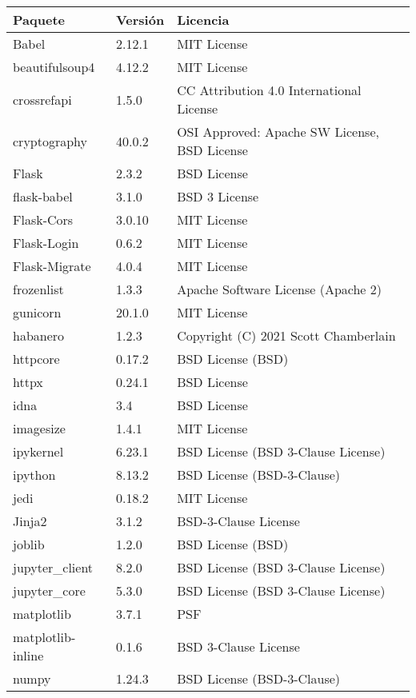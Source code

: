 \begin{table}[h]
\centering
\begin{tabular}{|l|l|l|}
\hline
\textbf{Paquete} & \textbf{Versión}& \textbf{Licencia} \\ \hline
Babel & 2.12.1 &  MIT License \\ \hline
beautifulsoup4 & 4.12.2 & MIT License \\ \hline
crossrefapi & 1.5.0 &  CC Attribution 4.0 International License \\ \hline
cryptography & 40.0.2 &  OSI Approved: Apache SW License, BSD License \\ \hline
Flask & 2.3.2 &  BSD License \\ \hline
flask-babel & 3.1.0 &  BSD 3 License \\ \hline
Flask-Cors & 3.0.10 &  MIT License \\ \hline
Flask-Login & 0.6.2 &  MIT License \\ \hline
Flask-Migrate & 4.0.4 &  MIT License \\ \hline
frozenlist & 1.3.3 &  Apache Software License (Apache 2) \\ \hline
gunicorn & 20.1.0 &  MIT License \\ \hline
habanero & 1.2.3 & Copyright (C) 2021 Scott Chamberlain \\ \hline
httpcore & 0.17.2 &  BSD License (BSD) \\ \hline
httpx & 0.24.1 &  BSD License \\ \hline
idna & 3.4 &  BSD License \\ \hline
imagesize & 1.4.1 &  MIT License \\ \hline
ipykernel & 6.23.1 &  BSD License (BSD 3-Clause License) \\ \hline
ipython & 8.13.2 &  BSD License (BSD-3-Clause) \\ \hline
jedi & 0.18.2 &  MIT License \\ \hline
Jinja2 & 3.1.2 &  BSD-3-Clause License \\ \hline
joblib & 1.2.0 &  BSD License (BSD) \\ \hline
jupyter\_client & 8.2.0 & BSD License (BSD 3-Clause License) \\ \hline
jupyter\_core & 5.3.0 & BSD License (BSD 3-Clause License) \\ \hline
matplotlib & 3.7.1 & PSF \\ \hline
matplotlib-inline & 0.1.6 & BSD 3-Clause License \\ \hline
numpy & 1.24.3 &  BSD License (BSD-3-Clause) \\ \hline

\end{tabular}
\end{table}
